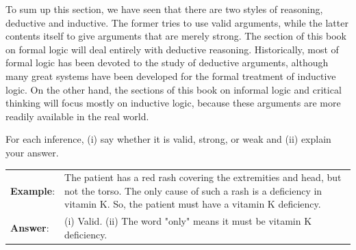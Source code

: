 To sum up this section, we have seen that there are two styles of reasoning, deductive and inductive. The former tries to use valid arguments, while the latter contents itself to give arguments that are merely strong. The section of this book on formal logic will deal entirely with deductive reasoning. Historically, most of formal logic has been devoted to the study of deductive arguments, although many great systems have been developed for the formal treatment of inductive logic. On the other hand, the sections of this book on informal logic and critical thinking will focus mostly on inductive logic, because these arguments are more readily available in the real world. 



\practiceproblems

\noindent\problempart For each inference, (i) say whether it is valid, strong, or weak and (ii) explain your answer.

\begin{longtabu}{p{.1\linewidth}p{.8\linewidth}}
\textbf{Example}: & The patient has a red rash covering the extremities and head, but not the torso. The only cause of such a rash is a deficiency in vitamin K. So, the patient must have a vitamin K deficiency. \\
\textbf{Answer}: & \noindent (i) Valid. \newline
\noindent (ii) The word "only" means it must be vitamin K deficiency.
\\
\end{longtabu}

